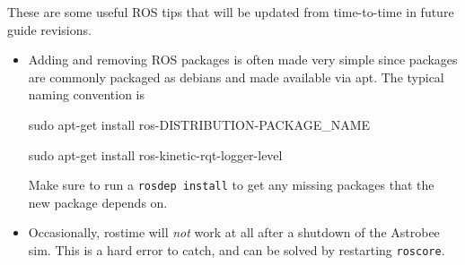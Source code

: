 \documentclass{article}
\begin{document}
These are some useful ROS tips that will be updated from time-to-time in future guide revisions.

\begin{itemize}
    \item Adding and removing ROS packages is often made very simple since packages are commonly packaged as debians and made available via apt. The typical naming convention is \begin{markdown}
	sudo apt-get install ros-DISTRIBUTION-PACKAGE_NAME
	
	sudo apt-get install ros-kinetic-rqt-logger-level
\end{markdown}

Make sure to run a \texttt{rosdep install} to get any missing packages that the new package depends on.

\item Occasionally, rostime will \textit{not} work at all after a shutdown of the Astrobee sim. This is a hard error to catch, and can be solved by restarting \texttt{roscore}.
\end{itemize}
\end{document}
